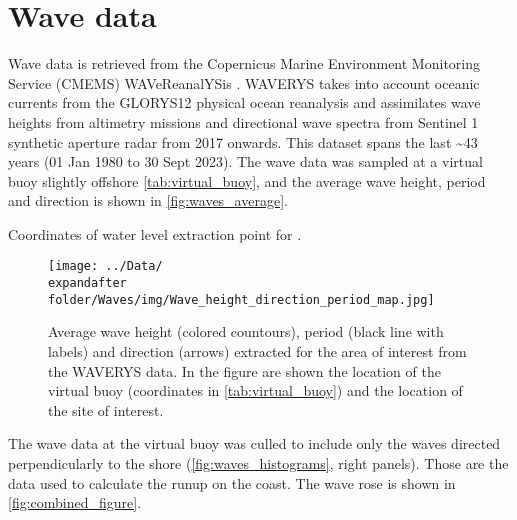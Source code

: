 \documentclass[a4paper, 11pt]{article}
\begin{document}
\pagebreak

\section*{Wave data}
Wave data is retrieved from the Copernicus Marine Environment Monitoring Service (CMEMS) WAVeReanalYSis \citep[WAVERYS,][]{law2021waverys}. WAVERYS takes into account oceanic currents from the GLORYS12 physical ocean reanalysis \citep{lellouche2018recent} and assimilates wave heights from altimetry missions and  directional wave spectra from Sentinel 1 synthetic aperture radar from 2017 onwards. This dataset spans the last \textasciitilde43 years (01 Jan 1980 to 30 Sept 2023). The wave data was sampled at a virtual buoy slightly offshore \sitename \autoref{tab:virtual_buoy}, and the average wave height, period and direction is shown in \autoref{fig:waves_average}.

\begin{table}[ht]
    \centering
    \caption{Coordinates of water level extraction point for \sitename.}
    \label{tab:virtual_buoy}
\end{table}


\begin{figure}[ht]
    \centering
	\texttt{[image: ../Data/\\expandafter\\folder/Waves/img/Wave\_height\_direction\_period\_map.jpg]}
    \caption{Average wave height (colored countours), period (black line with labels) and direction (arrows) extracted for the area of interest from the WAVERYS data. In the figure are shown the location of the virtual buoy (coordinates in \autoref{tab:virtual_buoy}) and the location of the site of interest.}
	\label{fig:waves_average}
\end{figure}

\pagebreak
The wave data at the virtual buoy was culled to include only the waves directed perpendicularly to the shore (\autoref{fig:waves_histograms}, right panels). Those are the data used to calculate the runup on the coast. The wave rose is shown in \autoref{fig:combined_figure}.
\end{document}
